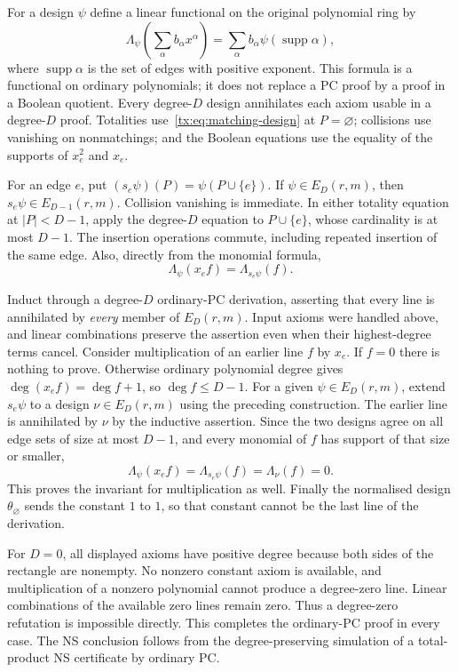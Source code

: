 For a design $\psi$ define a linear functional on the original polynomial
ring by
\[
 \Lambda_\psi\!\left(\sum_\alpha b_\alpha x^\alpha\right)
      =\sum_\alpha b_\alpha\psi(\operatorname{supp}\alpha),
\]
where $\operatorname{supp}\alpha$ is the set of edges with positive
exponent.  This formula is a functional on ordinary polynomials; it
does not replace a PC proof by a proof in a Boolean quotient.
Every degree-$D$ design annihilates each axiom usable in a degree-$D$
proof.  Totalities use~\eqref{tx:eq:matching-design} at $P=\varnothing$;
collisions use vanishing on nonmatchings; and the Boolean equations
use the equality of the supports of $x_e^2$ and $x_e$.

For an edge $e$, put $(s_e\psi)(P)=\psi(P\cup\{e\})$.
If $\psi\in E_D(r,m)$, then $s_e\psi\in E_{D-1}(r,m)$.
Collision vanishing is immediate.  In either totality equation at
$|P|<D-1$, apply the degree-$D$ equation to $P\cup\{e\}$, whose
cardinality is at most $D-1$.  The insertion operations commute,
including repeated insertion of the same edge.  Also, directly from
the monomial formula,
\[
 \Lambda_\psi(x_ef)=\Lambda_{s_e\psi}(f).
\]

Induct through a degree-$D$ ordinary-PC derivation, asserting that every
line is annihilated by \emph{every} member of $E_D(r,m)$.  Input axioms
were handled above, and linear combinations preserve the assertion
even when their highest-degree terms cancel.  Consider multiplication
of an earlier line $f$ by $x_e$.  If $f=0$ there is nothing to prove.
Otherwise ordinary polynomial degree gives
$\deg(x_ef)=\deg f+1$, so $\deg f\leq D-1$.
For a given $\psi\in E_D(r,m)$, extend $s_e\psi$ to a design
$\nu\in E_D(r,m)$ using the preceding construction.  The earlier line
is annihilated by $\nu$ by the inductive assertion.  Since the two
designs agree on all edge sets of size at most $D-1$, and every monomial
of $f$ has support of that size or smaller,
\[
 \Lambda_\psi(x_ef)=\Lambda_{s_e\psi}(f)=\Lambda_\nu(f)=0.
\]
This proves the invariant for multiplication as well.  Finally the
normalised design $\theta_{\varnothing}$ sends the constant $1$ to $1$,
so that constant cannot be the last line of the derivation.

For $D=0$, all displayed axioms have positive degree because both sides
of the rectangle are nonempty.  No nonzero constant axiom is available,
and multiplication of a nonzero polynomial cannot produce a degree-zero
line.  Linear combinations of the available zero lines remain zero.
Thus a degree-zero refutation is impossible directly.  This completes
the ordinary-PC proof in every case.  The NS conclusion follows from
the degree-preserving simulation of a total-product NS certificate by
ordinary PC.
